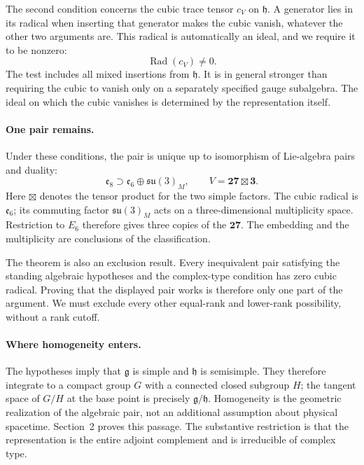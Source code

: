 \documentclass[11pt]{article}
\theoremstyle{remark}
\begin{document}
The second condition concerns the cubic trace tensor \(c_V\) on
\(\mathfrak h\). A generator lies in its radical when inserting that
generator makes the cubic vanish, whatever the other two arguments are.
This radical is automatically an ideal, and we require it to be nonzero:
\[
 \operatorname{Rad}(c_V)\ne0.
\]
The test includes all mixed insertions from \(\mathfrak h\). It is
in general stronger than requiring the cubic to vanish only on a separately specified
gauge subalgebra. The ideal on which the cubic vanishes is determined by
the representation itself.

\paragraph{One pair remains.}
Under these conditions, the pair is unique up to isomorphism of Lie-algebra
pairs and duality:
\[
 \mathfrak e_8\supset\mathfrak e_6\oplus\mathfrak{su}(3)_M,
 \qquad V=\mathbf{27}\boxtimes\mathbf3.
\]
Here \(\boxtimes\) denotes the tensor product for the two simple factors.
The cubic radical is \(\mathfrak e_6\); its commuting factor
\(\mathfrak{su}(3)_M\) acts on a three-dimensional multiplicity space.
Restriction to \(E_6\) therefore gives three copies of the \(\mathbf{27}\).
The embedding and the multiplicity are conclusions of the classification.

The theorem is also an exclusion result. Every inequivalent pair satisfying
the standing algebraic hypotheses and the complex-type condition has
zero cubic radical. Proving that the displayed pair works is therefore
only one part of the argument. We must exclude every other equal-rank and
lower-rank possibility, without a rank cutoff.

\paragraph{Where homogeneity enters.}
The hypotheses imply that \(\mathfrak g\) is simple and \(\mathfrak h\)
is semisimple. They therefore integrate to a compact group \(G\) with a
connected closed subgroup \(H\); the tangent space of \(G/H\) at the
base point is precisely \(\mathfrak g/\mathfrak h\). Homogeneity is the
geometric realization of the algebraic pair, not an additional assumption
about physical spacetime. Section~2 proves this passage. The substantive
restriction is that the representation is the entire adjoint complement
and is irreducible of complex type.
\end{document}
